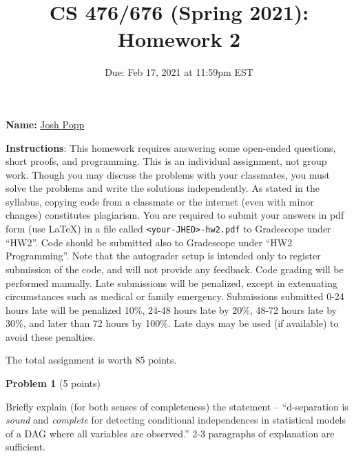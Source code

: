 \documentclass[letterpaper, 11pt]{article}
\title{CS 476/676 (Spring 2021): Homework 2}
\author{}
\date{Due: Feb 17, 2021 at 11:59pm EST}
\begin{document}
\maketitle

\setlength{\parindent}{0em}
\setlength{\parskip}{0.8em}

\large\textbf{Name:} \underline{\hspace{30pt} \color{blue} Josh Popp \hspace{30pt}}
\vspace{1em}

	\textbf{Instructions}: This homework requires answering some open-ended questions, short proofs, and
	programming. This is an individual assignment, not group work. Though you may
	discuss the problems with your classmates, you must solve the problems and
	write the solutions independently. As stated in the syllabus, copying code
	from a classmate or the internet (even with minor changes) constitutes
	plagiarism. You are required to submit your answers in pdf form (use \LaTeX)
	in a file called \texttt{<your-JHED>-hw2.pdf} to Gradescope under ``HW2''. Code should be submitted also to Gradescope under ``HW2 Programming''. Note that the autograder setup is intended only to register submission of the code, and will not provide any feedback. Code grading will be performed manually.
	Late submissions will be penalized, except in extenuating circumstances such
	as medical or family emergency. Submissions submitted 0-24 hours late will be
	penalized 10\%, 24-48 hours late by 20\%, 48-72 hours late by 30\%, and later
    than 72 hours by 100\%. Late days may be used (if available) to avoid these penalties.

    The total assignment is worth 85 points.

\vspace{1em}

{\large\textbf{Problem 1}} (5 points)

Briefly explain (for both senses of completeness) the statement -- ``d-separation is \emph{sound} and \emph{complete} for detecting conditional independences in statistical models of a DAG where all variables are observed.'' 2-3 paragraphs of explanation are sufficient.
\end{document}
